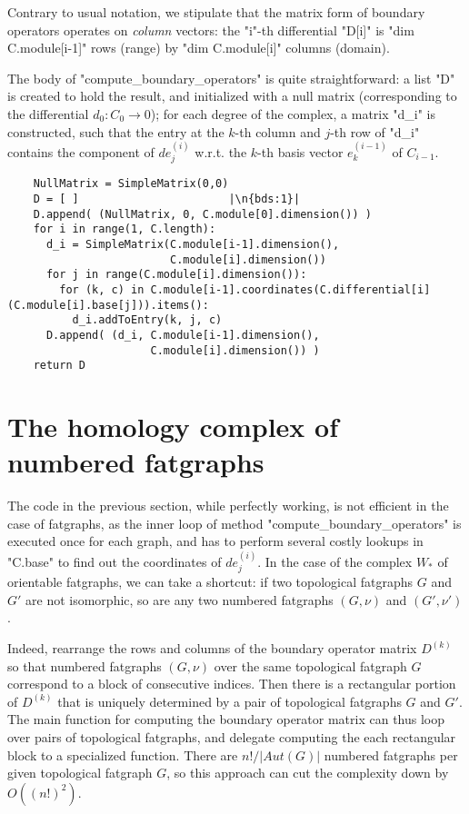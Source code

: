 Contrary to usual notation, we stipulate that the matrix form of
boundary operators operates on \emph{column} vectors: the "i"-th
differential "D[i]" is "dim C.module[i-1]" rows (range) by 
"dim C.module[i]" columns (domain).

The body of "compute_boundary_operators" is quite straightforward: a
list "D" is created to hold the result, and initialized with a null
matrix (corresponding to the differential $d_0: C_0 \to 0$); for each
degree of the complex, a matrix "d_i" is constructed, such that the
entry at the $k$-th column and $j$-th row of "d_i" contains the
component of $de^{(i)}_j$ w.r.t. the $k$-th basis vector $e^{(i-1)}_k$
of $C_{i-1}$.
\begin{lstlisting}
    NullMatrix = SimpleMatrix(0,0)
    D = [ ]                       |\n{bds:1}|
    D.append( (NullMatrix, 0, C.module[0].dimension()) )
    for i in range(1, C.length):
      d_i = SimpleMatrix(C.module[i-1].dimension(),
                         C.module[i].dimension())
      for j in range(C.module[i].dimension()):
        for (k, c) in C.module[i-1].coordinates(C.differential[i](C.module[i].base[j])).items():
          d_i.addToEntry(k, j, c)
      D.append( (d_i, C.module[i-1].dimension(), 
                      C.module[i].dimension()) )
    return D

\end{lstlisting}


\section{The homology complex of numbered fatgraphs}
\label{sec:homology-numbered-fatgraphs}

The code in the previous section, while perfectly working, is not
efficient in the case of fatgraphs, as the inner loop of method
"compute_boundary_operators" is executed once for each graph, and has
to perform several costly lookups in "C.base" to find out the
coordinates of $de^{(i)}_j$.  In the case of the complex $W_*$
of orientable fatgraphs, we can take a shortcut: if two topological
fatgraphs $G$ and $G'$ are not isomorphic, so are any two numbered
fatgraphs $(G,\nu)$ and $(G',\nu')$.  

Indeed, rearrange the rows and columns of the boundary operator matrix
$D^{(k)}$ so that numbered fatgraphs $(G,\nu)$ over the same
topological fatgraph $G$ correspond to a block of consecutive
indices. Then there is a rectangular portion of $D^{(k)}$ that is
uniquely determined by a pair of topological fatgraphs $G$ and $G'$.
The main function for computing the boundary operator matrix can thus loop
over pairs of topological fatgraphs, and delegate computing the each
rectangular block to a specialized function.  There are $n! / |Aut(G)|$
numbered fatgraphs per given topological fatgraph $G$, so this
approach can cut the complexity down by $O((n!)^2)$.

